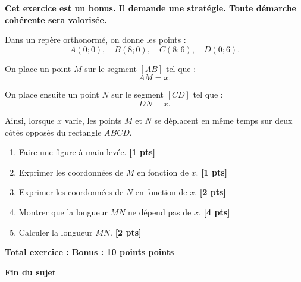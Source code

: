 \documentclass[11pt,a4paper]{article}
\newcommand{\points}[1]{\hfill \textbf{[#1 pts]}}
\newcommand{\totalexo}[1]{\begin{flushright}\textbf{Total exercice : #1 points}\end{flushright}}
\begin{document}
\textbf{Cet exercice est un bonus. Il demande une stratégie. Toute démarche cohérente sera valorisée.}

\medskip

Dans un repère orthonormé, on donne les points :
\[
A(0;0), \quad B(8;0), \quad C(8;6), \quad D(0;6).
\]

On place un point $M$ sur le segment $[AB]$ tel que :
\[
AM=x.
\]

On place ensuite un point $N$ sur le segment $[CD]$ tel que :
\[
DN=x.
\]

Ainsi, lorsque $x$ varie, les points $M$ et $N$ se déplacent en même temps sur deux côtés opposés du rectangle $ABCD$.

\begin{enumerate}
    \item Faire une figure à main levée. \points{1}

    \item Exprimer les coordonnées de $M$ en fonction de $x$. \points{1}

    \item Exprimer les coordonnées de $N$ en fonction de $x$. \points{2}

    \item Montrer que la longueur $MN$ ne dépend pas de $x$. \points{4}

    \item Calculer la longueur $MN$. \points{2}
\end{enumerate}

\totalexo{Bonus : 10 points}

\vspace{0.5cm}

\begin{center}
    \Large \textbf{Fin du sujet}
\end{center}
\end{document}
